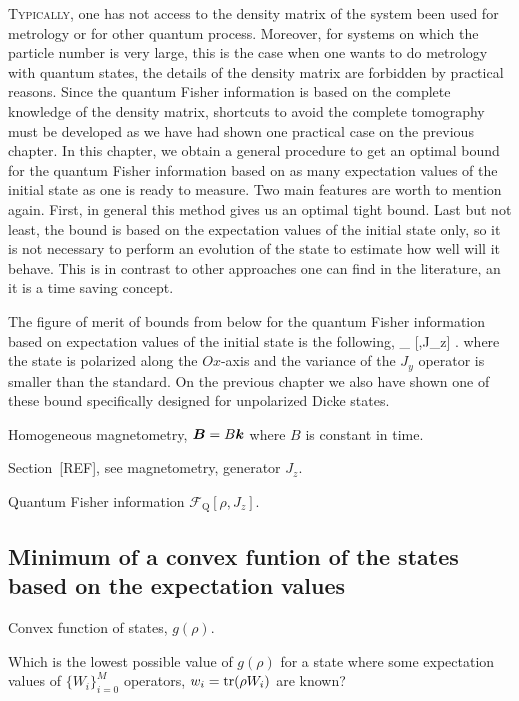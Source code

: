 \lettrine[lines=2, findent=3pt,nindent=0pt]{T}{ypically}, one has not access to the density matrix of the system been used for metrology or for other quantum process.
Moreover, for systems on which the particle number is very large, this is the case when one wants to do metrology with quantum states, the details of the density matrix are forbidden by practical reasons.
Since the quantum Fisher information is based on the complete knowledge of the density matrix, shortcuts to avoid the complete tomography must be developed as we have had shown one practical case on the previous chapter.
In this chapter, we obtain a general procedure to get an optimal bound for the quantum Fisher information based on as many expectation values of the initial state as one is ready to measure.
Two main features are worth to mention again.
First, in general this method gives us an optimal tight bound.
Last but not least, the bound is based on the expectation values of the initial state only, so it is not necessary to perform an evolution of the state to estimate how well will it behave.
This is in contrast to other approaches one can find in the literature, an it is a time saving concept.

The figure of merit of bounds from below for the quantum Fisher information based on expectation values of the initial state is the following,
\be
  _{} [\rho,J_z] \geq {}.
\ee
where the state is polarized along the $Ox$-axis and the variance of the $J_y$ operator is smaller than the standard.
On the previous chapter we also have shown one of these bound specifically designed for unpolarized Dicke states.

Homogeneous magnetometry, $\boldsymbol{B} = B\boldsymbol{k}$ where $B$ is constant in time.

Section~[REF], see magnetometry, generator $J_z$.

Quantum Fisher information $\mathcal{F}_{\text{Q}} [\rho, J_z]$.

\subsection{Minimum of a convex funtion of the states based on the expectation values}

Convex function of states, $g(\rho)$.

Which is the lowest possible value of $g(\rho)$ for a state where some expectation values of $\{W_{i}\}_{i=0}^M$ operators, $w_i = \operatorname{tr}(\rho {W}_i)$ are known?

